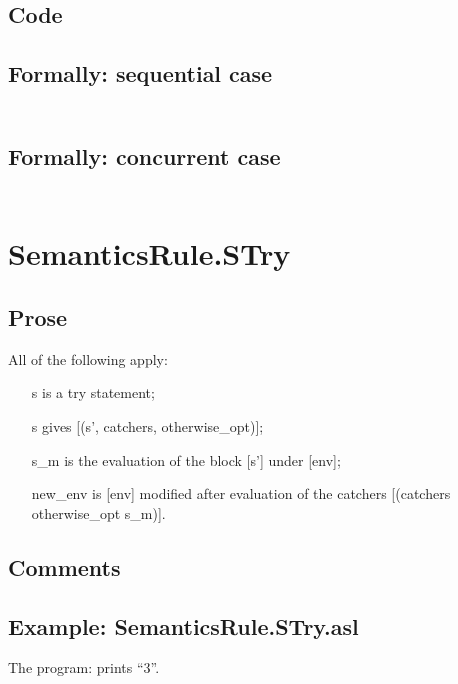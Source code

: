 \documentclass{book}
\begin{document}
  \subsection{Code}

  \subsection{Formally: sequential case}
  \begin{align}
  \end{align} 

  \subsection{Formally: concurrent case}
  \begin{align}
  \end{align} 

\section{SemanticsRule.STry \label{sec:SemanticsRule.STry}}

    \subsection{Prose}
    All of the following apply:
    \begin{itemize}
    \item [s] is a try statement;
    \item [s] gives [(s', catchers, otherwise\_opt)];
    \item [s\_m] is the evaluation of the block [s'] under [env];
    \item [new\_env] is [env] modified after evaluation of the catchers [(catchers
      otherwise\_opt s\_m)].
    \end{itemize}

    \subsection{Comments}

    \subsection{Example: SemanticsRule.STry.asl}
    The program:
    prints ``3''.
\end{document}
